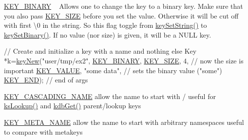 \begin{DoxyItemize}
\item \hyperlink{group__key_gga91fb3178848bd682000958089abbaf40a1ca18d4e094ae7487d35ecedda2235ff}{K\+E\+Y\+\_\+\+B\+I\+N\+A\+RY} ~\newline
 Allows one to change the key to a binary key. Make sure that you also pass \hyperlink{group__key_gga91fb3178848bd682000958089abbaf40a6d531b5c41445d19d0452eebdccbfa01}{K\+E\+Y\+\_\+\+S\+I\+ZE} before you set the value. Otherwise it will be cut off with first \textbackslash{}0 in the string. So this flag toggle from \hyperlink{group__keyvalue_ga622bde1eb0e0c4994728331326340ef2}{key\+Set\+String()} to \hyperlink{group__keyvalue_gaa50a5358fd328d373a45f395fa1b99e7}{key\+Set\+Binary()}. If no value (nor size) is given, it will be a N\+U\+LL key. 
\begin{DoxyCodeInclude}
\textcolor{comment}{// Create and initialize a key with a name and nothing else}
Key *k=\hyperlink{group__key_gad23c65b44bf48d773759e1f9a4d43b89}{keyNew}(\textcolor{stringliteral}{"user/tmp/ex2"},
        \hyperlink{group__key_gga91fb3178848bd682000958089abbaf40a1ca18d4e094ae7487d35ecedda2235ff}{KEY\_BINARY},
        \hyperlink{group__key_gga91fb3178848bd682000958089abbaf40a6d531b5c41445d19d0452eebdccbfa01}{KEY\_SIZE}, 4,               \textcolor{comment}{// now the size is important}
        \hyperlink{group__key_gga91fb3178848bd682000958089abbaf40ac66e4a49d09212b79f5754ca6db5bd2e}{KEY\_VALUE}, \textcolor{stringliteral}{"some data"},    \textcolor{comment}{// sets the binary value ("some")}
        \hyperlink{group__key_gga91fb3178848bd682000958089abbaf40aa8adb6fcb92dec58fb19410eacfdd403}{KEY\_END});                  \textcolor{comment}{// end of args}
\end{DoxyCodeInclude}

\item \hyperlink{group__key_gga91fb3178848bd682000958089abbaf40afc1567f74444ff9c219f7456b652b4ec}{K\+E\+Y\+\_\+\+C\+A\+S\+C\+A\+D\+I\+N\+G\+\_\+\+N\+A\+ME} allow the name to start with / useful for \hyperlink{group__keyset_gaa34fc43a081e6b01e4120daa6c112004}{ks\+Lookup()} and \hyperlink{group__kdb_ga28e385fd9cb7ccfe0b2f1ed2f62453a1}{kdb\+Get()} parent/lookup keys
\item \hyperlink{group__key_gga91fb3178848bd682000958089abbaf40a5205cbd2831bc881da3589a95c08e054}{K\+E\+Y\+\_\+\+M\+E\+T\+A\+\_\+\+N\+A\+ME} allow the name to start with arbitrary namespaces useful to compare with metakeys
\end{DoxyItemize}

